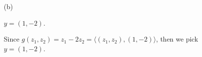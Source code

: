 \begin{Exercise}
	\begin{enumerate}[(a)]
		\item[(b)]
		\begin{answer}
			$y = (1,-2)$.
		\end{answer}
		\begin{solution}
			Since $g(z_1,z_2) = z_1-2z_2 = \langle (z_1,z_2),(1,-2) \rangle$, then we pick $y = (1,-2)$.
		\end{solution}
	\end{enumerate}
\end{Exercise}